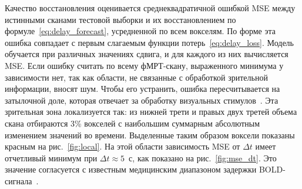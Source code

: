 Качество восстановления оценивается среднеквадратичной ошибкой MSE между истинными сканами тестовой выборки и их восстановлением по формуле~\eqref{eq:delay_forecast}, усредненной по всем вокселям. По форме эта ошибка совпадает с первым слагаемым функции потерь~\eqref{eq:delay_loss}. Модель обучается при различных значениях сдвига, и для каждого из них вычисляется MSE. Если ошибку считать по всему фМРТ-скану, выраженного минимума у зависимости нет, так как области, не связанные с обработкой зрительной информации, вносят шум. Чтобы его устранить, ошибка пересчитывается на затылочной доле, которая отвечает за обработку визуальных стимулов~\cite{anderson2006}. Эта зрительная зона локализуется так: из нижней трети и правых двух третей объема скана отбираются 3\% вокселей с наибольшим суммарным абсолютным изменением значений во времени. Выделенные таким образом воксели показаны красным на рис.~\ref{fig:local}. На этой области зависимость MSE от $\Delta t$ имеет отчетливый минимум при $\Delta t \approx 5$~с, как показано на рис.~\ref{fig:mse_dt}. Это значение согласуется с известным медицинским диапазоном задержки BOLD-сигнала~\cite{Bandettini1992}.

